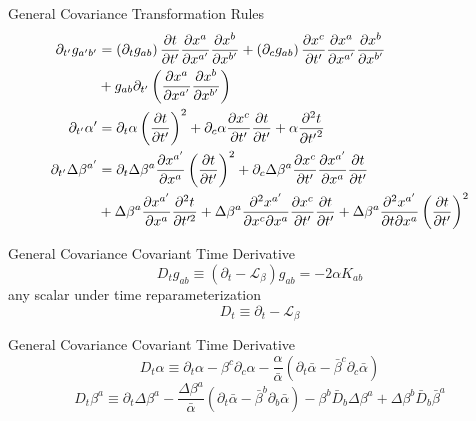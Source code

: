 \documentclass[xcolor=dvipsnames]{beamer}
\begin{document}
	\begin{frame}{General Covariance}
		Transformation Rules
		\begin{align*}
			\partial_{t'}g_{a'b'} &=  \left(\partial_{t}g_{ab}\right)\frac{\partial t}{\partial t'}\frac{\partial x^{a}}{\partial x^{a'}}\frac{\partial x^{b}}{\partial x^{b'}} + \left(\partial_{c}g_{ab}\right)\frac{\partial x^{c}}{\partial t'}\frac{\partial x^{a}}{\partial x^{a'}}\frac{\partial x^{b}}{\partial x^{b'}} \\
			&+ g_{ab}\partial_{t'}\left(\frac{\partial x^{a}}{\partial x^{a'}}\frac{\partial x^{b}}{\partial x^{b'}}\right)\\
			\partial_{t'}\alpha' &= \partial_{t}\alpha\left(\frac{\partial t}{\partial t'}\right)^{2} + \partial_{c}\alpha\frac{\partial x^{c}}{\partial t'}\frac{\partial t}{\partial t'} + \alpha\frac{\partial^{2}t}{\partial {t'}^{2}}\\
			\partial_{t'}\Delta \beta^{a'} &= \partial_{t}\Delta \beta^{a}\frac{\partial x^{a'}}{\partial x^{a}}\left(\frac{\partial t}{\partial t'}\right)^{2} + \partial_{c}\Delta \beta^{a}\frac{\partial x^{c}}{\partial t'}\frac{\partial x^{a'}}{\partial x^{a}}\frac{\partial t}{\partial t'}\notag\\
			& + \Delta \beta^{a}\frac{\partial x^{a'}}{\partial x^{a}}\frac{\partial^{2}t}{\partial t'^{2}} + \Delta \beta^{a}\frac{\partial^{2} x^{a'}}{\partial x^{c}\partial x^{a}}\frac{\partial x^{c}}{\partial t'}\frac{\partial t}{\partial t'} + \Delta \beta^{a}\frac{\partial^{2}x^{a'}}{\partial t\partial x^{a}}\left(\frac{\partial t}{\partial t'}\right)^{2}
		\end{align*}
	\end{frame}
	\begin{frame}{General Covariance}
		Covariant Time Derivative
		\[
			D_{t}g_{ab} \equiv (\partial_{t} - \mathcal{L}_{\beta})g_{ab} = -2\alpha K_{ab}
		\]
		\pause
		any scalar under time reparameterization
		\[
			D_{t} \equiv \partial_{t} - \mathcal{L}_{\beta} 
		\]		
	\end{frame}
	\begin{frame}{General Covariance}
		Covariant Time Derivative
		\[
		D_{t}\alpha \equiv \partial_{t}\alpha - \beta^{c}\partial_{c}\alpha - \frac{\alpha}{{\bar \alpha}}\left(\partial_{t}{\bar \alpha} - {\bar \beta}^{c}\partial_{c}{\bar \alpha}\right)
		\]
		\pause
		\[
		D_{t}\beta^{a} \equiv \partial_{t}\Delta \beta^{a} - \frac{\Delta \beta^{a}}{{\bar \alpha}}\left(\partial_{t}{\bar \alpha} - {\bar \beta}^{b}\partial_{b}{\bar \alpha}\right) - \beta^{b}{\bar D}_{b}\Delta \beta^{a} + \Delta \beta^{b}{\bar D}_{b}{\bar \beta}^{a}
		\]
	\end{frame}
\end{document}
